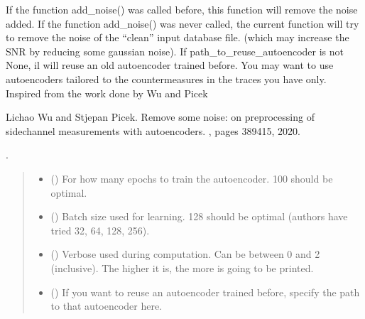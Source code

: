 \documentclass[letterpaper,10pt,english]{sphinxmanual}
\begin{document}
\begin{fulllineitems}
\begin{fulllineitems}
\sphinxAtStartPar
If the function add\_noise() was called before, this function will remove the noise added.
If the function add\_noise() was never called, the current function will try to remove
the noise of the “clean” input database file. (which may increase the SNR by reducing
some gaussian noise).
If path\_to\_reuse\_autoencoder is not None, il will reuse an old autoencoder trained before.
You may want to use autoencoders tailored to the countermeasures in the traces you have only.
Inspired from the work done by Wu and Picek%
\begin{footnote}[3]\sphinxAtStartFootnote
Lichao Wu and Stjepan Picek. Remove some noise: on pre\sphinxhyphen{}processing of side\sphinxhyphen{}channel measurements with autoencoders. , pages 389\textendash{}415, 2020.
%
\end{footnote}.
\begin{quote}\begin{description}
\begin{itemize}
\item {} 
\sphinxAtStartPar
{} (\sphinxstyleliteralemphasis{\sphinxupquote{, }}) \textendash{} For how many epochs to train the autoencoder. 100 should be optimal.

\item {} 
\sphinxAtStartPar
{} (\sphinxstyleliteralemphasis{\sphinxupquote{, }}) \textendash{} Batch size used for learning. 128 should be optimal (authors have tried 32, 64, 128, 256).

\item {} 
\sphinxAtStartPar
{} (\sphinxstyleliteralemphasis{\sphinxupquote{, }}) \textendash{} Verbose used during computation. Can be between 0 and 2 (inclusive). The higher it is, the
more is going to be printed.

\item {} 
\sphinxAtStartPar
{} (\sphinxstyleliteralemphasis{\sphinxupquote{, }}) \textendash{} If you want to reuse an autoencoder trained before, specify the path to that autoencoder here.


\end{itemize}
\end{description}
\end{quote}
\end{fulllineitems}
\end{fulllineitems}
\end{document}
